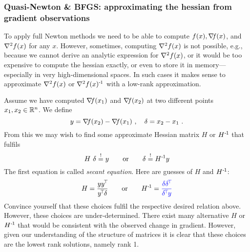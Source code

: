 \subsubsection{Quasi-Newton \& BFGS: approximating the hessian from gradient observations}

To apply full Newton methods we need to be able to compute $f(x), {\nabla_{\!\!}}
f(x)$, and ${\nabla_{\!\!}^2} f(x)$ for any $x$. However, sometimes, computing ${\nabla_{\!\!}^2} f(x)$ is not
possible, e.g., because we cannot derive an analytic expression for
${\nabla_{\!\!}^2} f(x)$, or it would be too expensive to compute the hessian
exactly, or even to store it in memory---especially in very
high-dimensional spaces. In such cases it makes sense to approximate
${\nabla_{\!\!}^2} f(x)$ or ${\nabla_{\!\!}^2} f(x)^{{\hspace*{-.0pt}\text{\rm -}\hspace*{-.5pt}}1}$ with a low-rank approximation.

Assume we have computed ${\nabla_{\!\!}} f(x_1)$ and ${\nabla_{\!\!}} f(x_2)$ at two different
points $x_1,x_2\in{\mathbb{R}}^n$. We define
\begin{equation}
y={\nabla_{\!\!}} f(x_2) - {\nabla_{\!\!}} f(x_1) ~,\quad \delta=x_2-x_1 ~.
\end{equation}
From this we may wish to find some approximate Hessian matrix $H$ or  $H^{{\hspace*{-.0pt}\text{\rm -}\hspace*{-.5pt}}1}$ that
fulfils
\begin{equation}
H~ \delta \overset{!}= y \qquad\text{or}\qquad  \delta \overset{!}= H^{{\hspace*{-.0pt}\text{\rm -}\hspace*{-.5pt}}1} y
\end{equation}
The first equation is called \emph{secant equation}. Here are guesses of  $H$ and  $H^{{\hspace*{-.0pt}\text{\rm -}\hspace*{-.5pt}}1}$:
\begin{equation}
H = \frac{y y^\T}{y^\T \d} \qquad\text{or}\qquad H^\1 = {\color{blue}\frac{\d \d^\T}{\d^\T y}}
\end{equation}
Convince yourself that these choices fulfil the respective desired relation
above. However, these choices are under-determined. There exist many
alternative $H$ or $H^{{\hspace*{-.0pt}\text{\rm -}\hspace*{-.5pt}}1}$ that would be consistent with the observed
change in gradient. However, given our understanding of the structure
of matrices it is clear that these choices are the lowest rank
solutions, namely rank 1.

